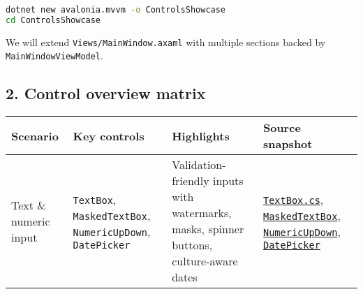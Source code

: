 \begin{lstlisting}[language=bash]
dotnet new avalonia.mvvm -o ControlsShowcase
cd ControlsShowcase
\end{lstlisting}

We will extend \passthrough{\lstinline!Views/MainWindow.axaml!} with
multiple sections backed by
\passthrough{\lstinline!MainWindowViewModel!}.

\subsection{2. Control overview matrix}\label{control-overview-matrix}

\begin{longtable}[]{@{}
  >{\raggedright\arraybackslash}p{}
  >{\raggedright\arraybackslash}p{}
  >{\raggedright\arraybackslash}p{}
  >{\raggedright\arraybackslash}p{}@{}}
\toprule\noalign{}
\begin{minipage}[b]{\linewidth}\raggedright
Scenario
\end{minipage} & \begin{minipage}[b]{\linewidth}\raggedright
Key controls
\end{minipage} & \begin{minipage}[b]{\linewidth}\raggedright
Highlights
\end{minipage} & \begin{minipage}[b]{\linewidth}\raggedright
Source snapshot
\end{minipage} \\
\midrule\noalign{}
\endhead
\bottomrule\noalign{}
\endlastfoot
Text \& numeric input & \passthrough{\lstinline!TextBox!},
\passthrough{\lstinline!MaskedTextBox!},
\passthrough{\lstinline!NumericUpDown!},
\passthrough{\lstinline!DatePicker!} & Validation-friendly inputs with
watermarks, masks, spinner buttons, culture-aware dates &
\href{https://github.com/AvaloniaUI/Avalonia/blob/master/src/Avalonia.Controls/TextBox.cs}{\passthrough{\lstinline!TextBox.cs!}},
\href{https://github.com/AvaloniaUI/Avalonia/blob/master/src/Avalonia.Controls/MaskedTextBox/MaskedTextBox.cs}{\passthrough{\lstinline!MaskedTextBox!}},
\href{https://github.com/AvaloniaUI/Avalonia/blob/master/src/Avalonia.Controls/NumericUpDown/NumericUpDown.cs}{\passthrough{\lstinline!NumericUpDown!}},
\href{https://github.com/AvaloniaUI/Avalonia/blob/master/src/Avalonia.Controls/DateTimePickers/DatePicker.cs}{\passthrough{\lstinline!DatePicker!}} \\

\end{longtable}
